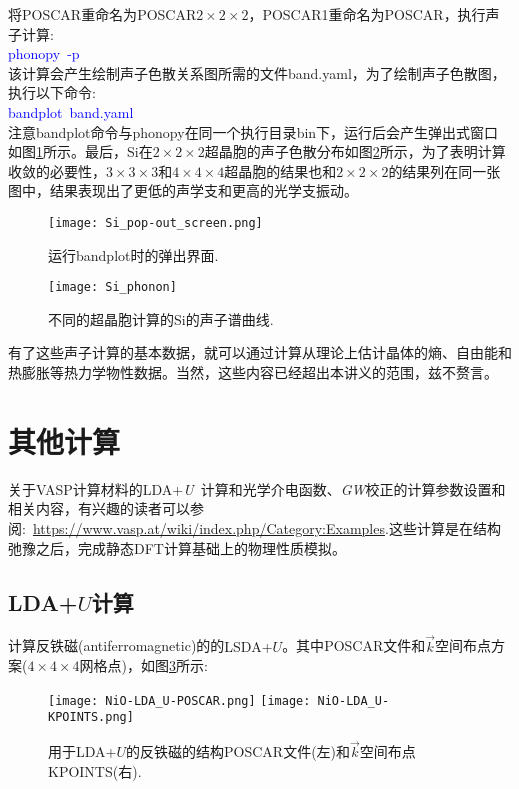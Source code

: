 将\textrm{POSCAR}重命名为\textrm{POSCAR}$2\times2\times2$，\textrm{POSCAR1}重命名为\textrm{POSCAR}，执行声子计算:~\\
\textcolor{blue}{\textrm{phonopy~-p}}\\
该计算会产生绘制声子色散关系图所需的文件\textrm{band.yaml}，为了绘制声子色散图，执行以下命令:~\\
\textcolor{blue}{\textrm{bandplot~band.yaml}}\\
注意\textrm{bandplot}命令与\textrm{phonopy}在同一个执行目录\textrm{bin}下，运行后会产生弹出式窗口如图\ref{Fig:Si_pop-out_screen}所示。最后，\textrm{Si}在$2\times2\times2$超晶胞的声子色散分布如图\ref{Fig:Si_phonon}所示，为了表明计算收敛的必要性，$3\times3\times3$和$4\times4\times4$超晶胞的结果也和$2\times2\times2$的结果列在同一张图中，结果表现出了更低的声学支和更高的光学支振动。
\begin{figure}[h!]
\centering
\texttt{[image: Si\_pop-out\_screen.png]}
\caption{\small \textrm{运行\textrm{bandplot}时的弹出界面.}}%
\label{Fig:Si_pop-out_screen}
\end{figure}

\begin{figure}[h!]
\centering
\texttt{[image: Si\_phonon]}
\caption{\small 不同的超晶胞计算的\textrm{Si}的声子谱曲线.}%
\label{Fig:Si_phonon}
\end{figure}

有了这些声子计算的基本数据，就可以通过计算从理论上估计晶体的熵、自由能和热膨胀等热力学物性数据。当然，这些内容已经超出本讲义的范围，兹不赘言。

\section{其他计算}
关于\textrm{VASP}计算材料的\textrm{LDA}+\textit{U}~计算和光学介电函数、\textit{GW}校正的计算参数设置和相关内容，有兴趣的读者可以参阅:~\url{https://www.vasp.at/wiki/index.php/Category:Examples}.这些计算是在结构弛豫之后，完成静态\textrm{DFT}计算基础上的物理性质模拟。
\subsection{LDA+$U$计算}
计算反铁磁(\textrm{antiferromagnetic})的的\textrm{LSDA+$U$}。其中\textrm{POSCAR}文件和$\vec k$空间布点方案($4\times4\times4$网格点)，如图\ref{NiO-LDA_U-Input}所示:~
\begin{figure}[h!]
\centering
\texttt{[image: NiO-LDA\_U-POSCAR.png]}
\texttt{[image: NiO-LDA\_U-KPOINTS.png]}
\caption{\small \textrm{用于\textrm{LDA}+$U$的反铁磁的结构\textrm{POSCAR}文件(左)和$\vec k$空间布点\textrm{KPOINTS}(右).}}%
\label{NiO-LDA_U-Input}
\end{figure}

